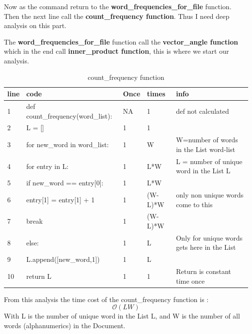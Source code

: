 \documentclass{article}
\begin{document}
    Now as the command return to the \textbf{word\_frequencies\_for\_file }function. Then the next line call the \textbf{count\_frequency function}. Thus I need deep analysis on this part. 

    The \textbf{word\_frequencies\_for\_file }function call the \textbf{vector\_angle function} which in the end call \textbf{inner\_product function}, this is where we start our analysis.
    \newpage
    \begin{table}[H]
        \begin{center}
            \caption{count\_frequency function}
            \begin{tabular}{l|l|l|l|p{5cm}}
                \hline
                line & code & Once & times & info\\
                \hline
                1 & def count\_frequency(word\_list):& NA & 1 & def not calculated\\
                \hline
                2 & L = [] & 1 & 1 & \\
                \hline
                3 & for new\_word in word\_list: & 1 & W & W=number of words in the List word-list\\
                \hline
                4 & for entry in L: & 1 & L*W & L = number of unique word in the List L \\
                \hline
                5 & if new\_word == entry[0]: & 1 & L*W& \\
                \hline
                6 & entry[1] = entry[1] + 1 & 1& (W-L)*W & only non unique words come to this\\
                \hline
                7 & break & 1 & (W-L)*W & \\
                \hline
                8 & else: & 1 & L & Only for unique words gets here in the List\\
                \hline
                9 & L.append([new\_word,1]) & 1 & L & \\
                \hline
                10 & return L & 1 & 1 & Return is constant time once\\
                \hline
            \end{tabular}
        \end{center}
    \end{table}
    From this analysis the time cost of the count\_frequency function is :
    \[\mathcal{O}(LW) \]
    With L is the number of unique word in the List L, and W is the number of all words (alphanumerics) in the Document.
\end{document}
